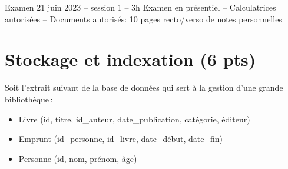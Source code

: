 
%
{Examen 21 juin 2023 -- session 1 -- 3h}%
{Examen en présentiel -- Calculatrices autorisées -- Documents autorisés: 10 pages recto/verso de notes personnelles}%

\section{Stockage et indexation (6 pts)}

Soit l'extrait suivant de la base de données qui sert à la gestion d'une grande
 bibliothèque\,:

\begin{itemize}
  \item Livre (id, titre, id\_auteur, date\_publication, catégorie, éditeur)
  \item Emprunt (id\_personne, id\_livre, date\_début, date\_fin)
  \item Personne  (id, nom, prénom, âge)
\end{itemize}

